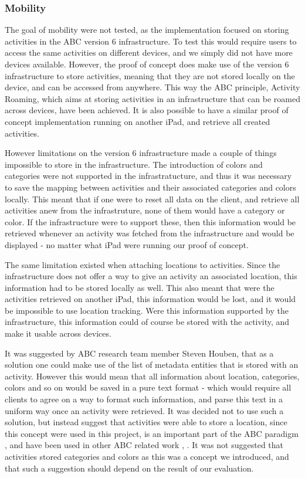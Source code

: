 \subsubsection{Mobility}
The goal of mobility were not tested, as the implementation focused on storing activities in the ABC version 6 infrastructure. To test this would require users to access the same activities on different devices, and we simply did not have more devices available. However, the proof of concept does make use of the version 6 infrastructure to store activities, meaning that they are not stored locally on the device, and can be accessed from anywhere. This way the ABC principle, Activity Roaming, which aims at storing activities in an infrastructure that can be roamed across devices, have been achieved. It is also possible to have a similar proof of concept implementation running on another iPad, and retrieve all created activities. 

However limitations on the version 6 infrastructure made a couple of things impossible to store in the infrastructure. The introduction of colors and categories were not supported in the infrastratucture, and thus it was necessary to save the mapping between activities and their associated categories and colors locally. This meant that if one were to reset all data on the client, and retrieve all activities anew from the infrastruture, none of them would have a category or color. If the infrastructure were to support these, then this information would be retrieved whenever an activity was fetched from the infrastructure and would be displayed - no matter what iPad were running our proof of concept.

The same limitation existed when attaching locations to activities. Since the infrastructure does not offer a way to give an activity an associated location, this information had to be stored locally as well. This also meant that were the activities retrieved on another iPad, this information would be lost, and it would be impossible to use location tracking. Were this information supported by the infrastructure, this information could of course be stored with the activity, and make it usable across devices.

It was suggested by ABC research team member Steven Houben, that as a solution one could make use of the list of metadata entities that is stored with an activity. However this would mean that all information about location, categories, colors and so on would be saved in a pure text format - which would require all clients to agree on a way to format such information, and parse this text in a uniform way once an activity were retrieved. It was decided not to use such a solution, but instead suggest that activities were able to store a location, since this concept were used in this project, is an important part of the ABC paradigm \citep{bardram2011}, and have been used in other ABC related work \citep{bardram2012}, \citep{bardram2009}. It was not suggested that activities stored categories and colors as this was a concept we introduced, and that such a suggestion should depend on the result of our evaluation.



